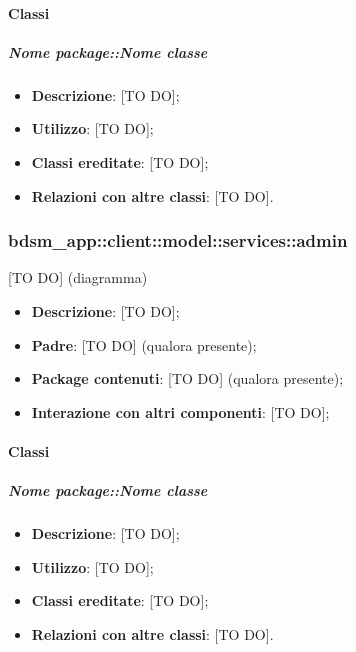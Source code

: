 		\paragraph{Classi} %
			\subparagraph{Nome package::Nome classe} %
			\label{subp:subparagraph_name}
				\begin{itemize}
					\item \textbf{Descrizione}: [TO DO];
					\item \textbf{Utilizzo}: [TO DO];
					\item \textbf{Classi ereditate}: [TO DO];
					\item \textbf{Relazioni con altre classi}: [TO DO].
				\end{itemize}	

	\subsubsection{bdsm\_app::client::model::services::admin} %
	\label{ssub:bdsm_app_client_model_services_admin}
	[TO DO] (diagramma) \newline \newline

	\begin{itemize}
		\item \textbf{Descrizione}: [TO DO];
		\item \textbf{Padre}: [TO DO] (qualora presente);
		\item \textbf{Package contenuti}: [TO DO] (qualora presente);
		\item \textbf{Interazione con altri componenti}: [TO DO];
	\end{itemize}

		\paragraph{Classi} %
			\subparagraph{Nome package::Nome classe} %
			\label{subp:subparagraph_name}
				\begin{itemize}
					\item \textbf{Descrizione}: [TO DO];
					\item \textbf{Utilizzo}: [TO DO];
					\item \textbf{Classi ereditate}: [TO DO];
					\item \textbf{Relazioni con altre classi}: [TO DO].
				\end{itemize}	







